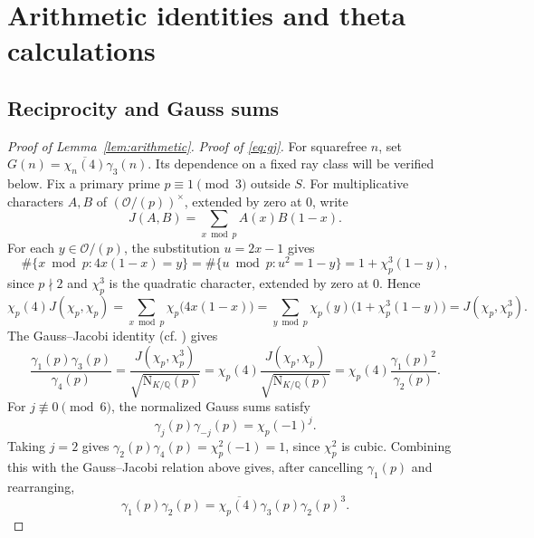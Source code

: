 \documentclass[11pt,a4paper]{article}
\numberwithin{equation}{section}
\numberwithin{figure}{section}
\theoremstyle{definition}
\theoremstyle{remark}
\newcommand{\Q}{\mathbb Q}
\newcommand{\NK}{\mathrm N_{K/\Q}}
\newcommand{\OO}{\mathcal O}
\begin{document}
\appendix
\section{Arithmetic identities and theta calculations}\label{sec:arithmetic}

\subsection{Reciprocity and Gauss sums}\label{app:gauss-identities}

\begin{proof}[Proof of Lemma~\ref{lem:arithmetic}]
\par\noindent\textit{Proof of \eqref{eq:gj}.}\quad
For squarefree $n$, set $G(n)=\overline{\chi_n(4)}\gamma_3(n)$.
Its dependence on a fixed ray class will be verified below.
Fix a primary prime $p\equiv1\pmod3$ outside $S$. For multiplicative characters $A,B$ of $(\OO/(p))^\times$,
extended by zero at $0$, write
\[
J(A,B)=\sum_{x\bmod p}A(x)B(1-x).
\]
For each $y\in\OO/(p)$, the substitution $u=2x-1$ gives
\[
 \#\{x\bmod p:4x(1-x)=y\} =\#\{u\bmod p:u^2=1-y\} =1+\chi_p^3(1-y),
\]
since $p\nmid2$ and $\chi_p^3$ is the quadratic character, extended
by zero at $0$. Hence
\[
 \chi_p(4)J(\chi_p,\chi_p) =\sum_{x\bmod p}\chi_p\bigl(4x(1-x)\bigr) =\sum_{y\bmod p}\chi_p(y)\bigl(1+\chi_p^3(1-y)\bigr) =J(\chi_p,\chi_p^3).
\]
The Gauss--Jacobi identity (cf. \cite[(3.18)]{IK04}) gives
\[
 \frac{\gamma_1(p)\gamma_3(p)}{\gamma_4(p)}
 =\frac{J(\chi_p,\chi_p^3)}{\sqrt{\NK(p)}}
 =\chi_p(4)\frac{J(\chi_p,\chi_p)}{\sqrt{\NK(p)}}
 =\chi_p(4)\frac{\gamma_1(p)^2}{\gamma_2(p)}.
\]
For $j\not\equiv0\pmod6$, the normalized Gauss sums satisfy
\[
 \gamma_j(p)\gamma_{-j}(p)=\chi_p(-1)^j.
\]
Taking $j=2$ gives $\gamma_2(p)\gamma_4(p)=\chi_p^2(-1)=1$,
since $\chi_p^2$ is cubic.
Combining this with the Gauss--Jacobi relation above gives, after
cancelling $\gamma_1(p)$ and rearranging,
\[
\gamma_1(p)\gamma_2(p)=\overline{\chi_p(4)}\gamma_3(p)\gamma_2(p)^3.
\]


\end{proof}
\end{document}
